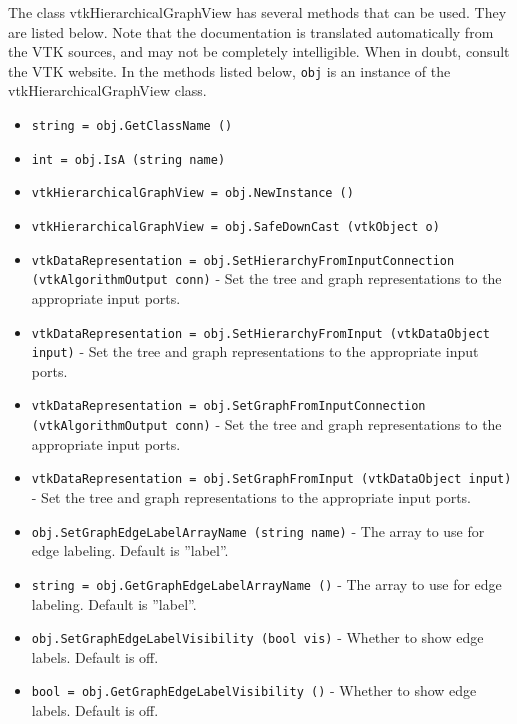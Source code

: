 The class vtkHierarchicalGraphView has several methods that can be used.
  They are listed below.
Note that the documentation is translated automatically from the VTK sources,
and may not be completely intelligible.  When in doubt, consult the VTK website.
In the methods listed below, \verb|obj| is an instance of the vtkHierarchicalGraphView class.
\begin{itemize}
\item  \verb|string = obj.GetClassName ()|

\item  \verb|int = obj.IsA (string name)|

\item  \verb|vtkHierarchicalGraphView = obj.NewInstance ()|

\item  \verb|vtkHierarchicalGraphView = obj.SafeDownCast (vtkObject o)|

\item  \verb|vtkDataRepresentation = obj.SetHierarchyFromInputConnection (vtkAlgorithmOutput conn)| -  Set the tree and graph representations to the appropriate input ports.

\item  \verb|vtkDataRepresentation = obj.SetHierarchyFromInput (vtkDataObject input)| -  Set the tree and graph representations to the appropriate input ports.

\item  \verb|vtkDataRepresentation = obj.SetGraphFromInputConnection (vtkAlgorithmOutput conn)| -  Set the tree and graph representations to the appropriate input ports.

\item  \verb|vtkDataRepresentation = obj.SetGraphFromInput (vtkDataObject input)| -  Set the tree and graph representations to the appropriate input ports.

\item  \verb|obj.SetGraphEdgeLabelArrayName (string name)| -  The array to use for edge labeling.  Default is ''label''.

\item  \verb|string = obj.GetGraphEdgeLabelArrayName ()| -  The array to use for edge labeling.  Default is ''label''.

\item  \verb|obj.SetGraphEdgeLabelVisibility (bool vis)| -  Whether to show edge labels.  Default is off.

\item  \verb|bool = obj.GetGraphEdgeLabelVisibility ()| -  Whether to show edge labels.  Default is off.


\end{itemize}
